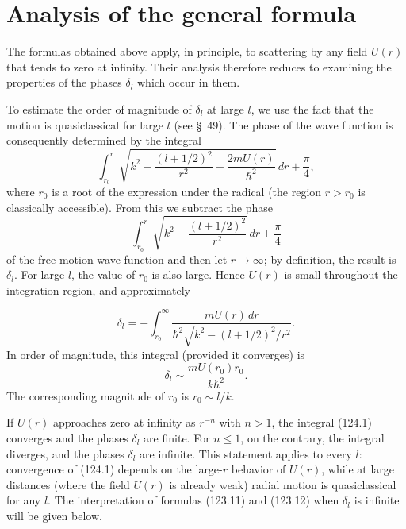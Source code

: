 \section{Analysis of the general formula}

The formulas obtained above apply, in principle, to scattering by any field
$U(r)$ that tends to zero at infinity.  Their analysis therefore reduces to
examining the properties of the phases $\delta_l$ which occur in them.

To estimate the order of magnitude of $\delta_l$ at large $l$, we use the
fact that the motion is quasiclassical for large $l$ (see \S~49).  The phase
of the wave function is consequently determined by the integral
\[
 \int_{r_0}^{r}\sqrt{k^2-\frac{(l+1/2)^2}{r^2}
 -\frac{2mU(r)}{\hbar^2}}\,dr+\frac\pi4,
\]
where $r_0$ is a root of the expression under the radical (the region
$r>r_0$ is classically accessible).  From this we subtract the phase
\[
 \int_{r_0}^{r}\sqrt{k^2-\frac{(l+1/2)^2}{r^2}}\,dr+\frac\pi4
\]
of the free-motion wave function and then let $r\to\infty$; by definition,
the result is $\delta_l$.  For large $l$, the value of $r_0$ is also large.
Hence $U(r)$ is small throughout the integration region, and approximately

\begin{equation}
 \delta_l=-\int_{r_0}^{\infty}
 \frac{mU(r)\,dr}{\hbar^2\sqrt{k^2-(l+1/2)^2/r^2}}.
 \tag{124.1}
\end{equation}
In order of magnitude, this integral (provided it converges) is
\begin{equation}
 \delta_l\sim\frac{mU(r_0)r_0}{k\hbar^2}.
 \tag{124.2}
\end{equation}
The corresponding magnitude of $r_0$ is $r_0\sim l/k$.

If $U(r)$ approaches zero at infinity as $r^{-n}$ with $n>1$, the integral
(124.1) converges and the phases $\delta_l$ are finite.  For $n\leqslant1$,
on the contrary, the integral diverges, and the phases $\delta_l$ are
infinite.  This statement applies to every $l$: convergence of (124.1)
depends on the large-$r$ behavior of $U(r)$, while at large distances (where
the field $U(r)$ is already weak) radial motion is quasiclassical for any
$l$.  The interpretation of formulas (123.11) and (123.12) when $\delta_l$
is infinite will be given below.

